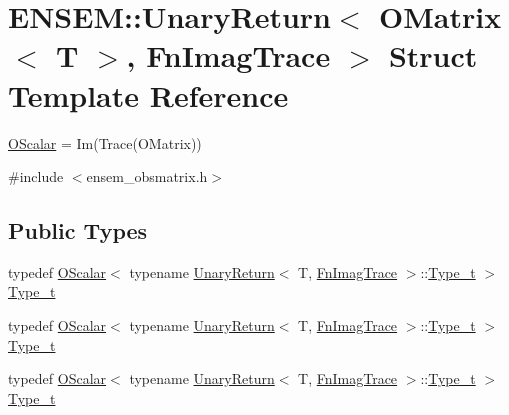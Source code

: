 \hypertarget{structENSEM_1_1UnaryReturn_3_01OMatrix_3_01T_01_4_00_01FnImagTrace_01_4}{}\section{E\+N\+S\+EM\+:\+:Unary\+Return$<$ O\+Matrix$<$ T $>$, Fn\+Imag\+Trace $>$ Struct Template Reference}
\label{structENSEM_1_1UnaryReturn_3_01OMatrix_3_01T_01_4_00_01FnImagTrace_01_4}


\mbox{\hyperlink{classENSEM_1_1OScalar}{O\+Scalar}} = Im(\+Trace(\+O\+Matrix))  




{\ttfamily \#include $<$ensem\+\_\+obsmatrix.\+h$>$}

\subsection*{Public Types}
\begin{DoxyCompactItemize}
\item 
typedef \mbox{\hyperlink{classENSEM_1_1OScalar}{O\+Scalar}}$<$ typename \mbox{\hyperlink{structENSEM_1_1UnaryReturn}{Unary\+Return}}$<$ T, \mbox{\hyperlink{structENSEM_1_1FnImagTrace}{Fn\+Imag\+Trace}} $>$\+::\mbox{\hyperlink{structENSEM_1_1UnaryReturn_3_01OMatrix_3_01T_01_4_00_01FnImagTrace_01_4_a7b4a608d50b5637e2ca0d51ba6ff692b}{Type\+\_\+t}} $>$ \mbox{\hyperlink{structENSEM_1_1UnaryReturn_3_01OMatrix_3_01T_01_4_00_01FnImagTrace_01_4_a7b4a608d50b5637e2ca0d51ba6ff692b}{Type\+\_\+t}}
\item 
typedef \mbox{\hyperlink{classENSEM_1_1OScalar}{O\+Scalar}}$<$ typename \mbox{\hyperlink{structENSEM_1_1UnaryReturn}{Unary\+Return}}$<$ T, \mbox{\hyperlink{structENSEM_1_1FnImagTrace}{Fn\+Imag\+Trace}} $>$\+::\mbox{\hyperlink{structENSEM_1_1UnaryReturn_3_01OMatrix_3_01T_01_4_00_01FnImagTrace_01_4_a7b4a608d50b5637e2ca0d51ba6ff692b}{Type\+\_\+t}} $>$ \mbox{\hyperlink{structENSEM_1_1UnaryReturn_3_01OMatrix_3_01T_01_4_00_01FnImagTrace_01_4_a7b4a608d50b5637e2ca0d51ba6ff692b}{Type\+\_\+t}}
\item 
typedef \mbox{\hyperlink{classENSEM_1_1OScalar}{O\+Scalar}}$<$ typename \mbox{\hyperlink{structENSEM_1_1UnaryReturn}{Unary\+Return}}$<$ T, \mbox{\hyperlink{structENSEM_1_1FnImagTrace}{Fn\+Imag\+Trace}} $>$\+::\mbox{\hyperlink{structENSEM_1_1UnaryReturn_3_01OMatrix_3_01T_01_4_00_01FnImagTrace_01_4_a7b4a608d50b5637e2ca0d51ba6ff692b}{Type\+\_\+t}} $>$ \mbox{\hyperlink{structENSEM_1_1UnaryReturn_3_01OMatrix_3_01T_01_4_00_01FnImagTrace_01_4_a7b4a608d50b5637e2ca0d51ba6ff692b}{Type\+\_\+t}}
\end{DoxyCompactItemize}


